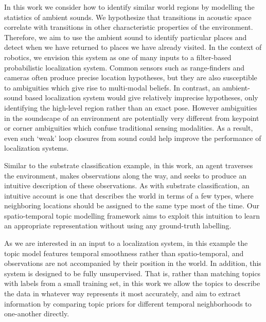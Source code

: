 In this work we consider how to identify similar world regions by modelling the statistics of ambient sounds. We hypothesize that transitions in acoustic space correlate with transitions in other characteristic properties of the environment. Therefore, we aim to use the ambient sound to identify particular places and detect when we have returned to places we have already visited. In the context of robotics, we envision this system as one of many inputs to a filter-based probabilistic localization system. Common sensors such as range-finders and cameras often produce precise location hypotheses, but they are also susceptible to ambiguities which give rise to multi-modal beliefs. In contrast, an ambient-sound based localization system would give relatively imprecise hypotheses, only identifying the high-level region rather than an exact pose. However ambiguities in the soundscape of an environment are potentially very different from keypoint or corner ambiguities which confuse traditional sensing modalities. As a result, even such `weak' loop closures from sound could help improve the performance of localization systems.

Similar to the substrate classification example, in this work, an agent traverses the environment, makes observations along the way, and seeks to produce an intuitive description of these observations. As with substrate classification, an intuitive account is one that describes the world in terms of a few types, where neighboring locations should be assigned to the same type most of the time. Our spatio-temporal topic modelling framework aims to exploit this intuition to learn an appropriate representation without using any ground-truth labelling.

As we are interested in an input to a localization system, in this example the topic model features temporal smoothness rather than spatio-temporal, and observations are not accompanied by their position in the world. In addition, this system is designed to be fully unsupervised. That is, rather than matching topics with labels from a small training set, in this work we allow the topics to describe the data in whatever way represents it most accurately, and aim to extract information by comparing topic priors for different temporal neighborhoods to one-another directly.



